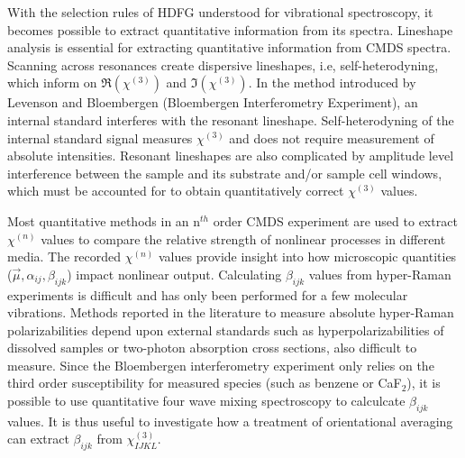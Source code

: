 \documentclass[aip, jcp, reprint, onecolumn]{revtex4-2}
\begin{document}
With the selection rules of HDFG understood for vibrational spectroscopy, it becomes possible to extract quantitative information from its spectra.
Lineshape analysis is essential for extracting quantitative information from CMDS spectra.
Scanning across resonances create dispersive lineshapes, i.e, self-heterodyning, which inform on $\Re(\chi^{(3)})$ and $\Im(\chi^{(3)})$.\cite{Levenson1974_1, Levenson1974_2}
In the method introduced by Levenson and Bloembergen (Bloembergen Interferometry Experiment), an internal standard interferes with the resonant lineshape.
Self-heterodyning of the internal standard signal measures $\chi^{(3)}$ and does not require measurement of absolute intensities. 
Resonant lineshapes are also complicated by amplitude level interference between the sample and its substrate and/or sample cell windows, which must be accounted for to obtain quantitatively correct $\chi^{(3)}$ values. \cite{RN362, RN418}

Most quantitative methods in an n$^{th}$ order CMDS experiment are used to extract $\chi^{(n)}$ values to compare the relative strength of nonlinear processes in different media. \cite{Zhu87, RN351, RN345}
The recorded $\chi^{(n)}$ values provide insight into how microscopic quantities ($\vec{\mu}, \alpha_{ij}, \beta_{ijk}$) impact nonlinear output.
Calculating $\beta_{ijk}$ values from hyper-Raman experiments is difficult and has only been performed for a few molecular vibrations. \cite{Xu1997, Shoute2005, Kelley2010}
Methods reported in the literature to measure absolute hyper-Raman polarizabilities depend upon external standards such as hyperpolarizabilities of dissolved samples or two-photon absorption cross sections, also difficult to measure.
Since the Bloembergen interferometry experiment only relies on the third order susceptibility for measured species (such as benzene or CaF$_2$), it is possible to use quantitative four wave mixing spectroscopy to calculcate $\beta_{ijk}$ values.
It is thus useful to investigate how a treatment of orientational averaging can extract $\beta_{ijk}$ from $\chi^{(3)}_{IJKL}$.
\end{document}
